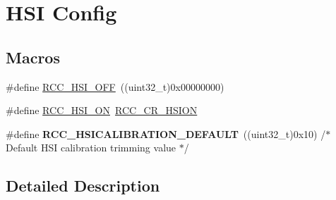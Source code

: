 \hypertarget{group___r_c_c___h_s_i___config}{\section{H\-S\-I Config}
\label{group___r_c_c___h_s_i___config}
}
\subsection*{Macros}
\begin{DoxyCompactItemize}
\item 
\#define \hyperlink{group___r_c_c___h_s_i___config_ga1b34d37d3b51afec0758b3ddc7a7e665}{R\-C\-C\-\_\-\-H\-S\-I\-\_\-\-O\-F\-F}~((uint32\-\_\-t)0x00000000)
\item 
\#define \hyperlink{group___r_c_c___h_s_i___config_ga0bf09ef9e46d5da25cced7b3122f92f5}{R\-C\-C\-\_\-\-H\-S\-I\-\_\-\-O\-N}~\hyperlink{group___peripheral___registers___bits___definition_gaf4fcacf94a97f7d49a70e089b39cf474}{R\-C\-C\-\_\-\-C\-R\-\_\-\-H\-S\-I\-O\-N}
\item 
\hypertarget{group___r_c_c___h_s_i___config_ga03cf582e263fb7e31a7783d8adabd7a0}{\#define {\bfseries R\-C\-C\-\_\-\-H\-S\-I\-C\-A\-L\-I\-B\-R\-A\-T\-I\-O\-N\-\_\-\-D\-E\-F\-A\-U\-L\-T}~((uint32\-\_\-t)0x10)         /$\ast$ Default H\-S\-I calibration trimming value $\ast$/}\label{group___r_c_c___h_s_i___config_ga03cf582e263fb7e31a7783d8adabd7a0}

\end{DoxyCompactItemize}


\subsection{Detailed Description}


